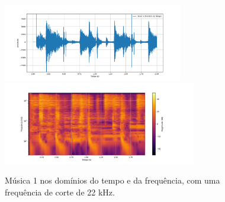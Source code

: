 \begin{figure}[htpb]
    \centering
    \includegraphics[width=0.7\textwidth]{figuras/fig30.png}
    \includegraphics[width=0.75\textwidth]{figuras/fig31.png}
    \caption{Música 1 nos domínios do tempo e da frequência, com uma frequência de corte de 22 kHz.}
    \label{fig30}
\end{figure}






